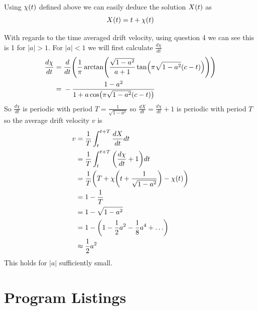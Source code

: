 \documentclass[11pt]{article} %
\let\originalleft\left
\let\originalright\right
\renewcommand{\left}{\mathopen{}\mathclose\bgroup\originalleft}
\renewcommand{\right}{\aftergroup\egroup\originalright}
\begin{document}
Using $\chi\left(t\right)$ defined above we can easily deduce the solution $X\left(t\right)$ as
\begin{equation*}
	X\left(t\right) = t + \chi\left(t\right)
\end{equation*}

With regards to the time averaged drift velocity, using question 4 we can see this is 1 for $|a|>1$. For $|a| <1$ we will first calculate $\frac{d\chi}{dt}$
\begin{align*}
	\frac{d\chi}{dt} = {} & \frac{d}{dt}\left(\frac{1}{\pi}\arctan\left(\frac{\sqrt{1-a^2}}{a+1}\tan\left(\pi\sqrt{1-a^2}\left(c-t\right)\right)\right)\right) \\
			     = {} & -\frac{1-a^2}{1+a\cos\left(\pi\sqrt{1-a^2}\left(c-t\right)\right)}
\end{align*}
So $\frac{d\chi}{dt}$ is periodic with period $T = \frac{1}{\sqrt{1-a^2}}$ so $\frac{dX}{dt} = \frac{d\chi}{dt} + 1$ is periodic with period $T$ so the average drift velocity $v$ is
\begin{align*}
	v = {} & \frac{1}{T}\int_{t}^{t+T}{\frac{dX}{dt} dt}\\
	   = {} & \frac{1}{T}\int_{t}^{t+T}{\left(\frac{d\chi}{dt}+1\right) dt} \\
	   = {} & \frac{1}{T}\left(T + \chi\left(t+\frac{1}{\sqrt{1-a^2}}\right)-\chi\left(t\right)\right) \\
	   = {} & 1 - \frac{1}{T} \\
	   = {} & 1 - \sqrt{1-a^2} \\
	   = {} & 1 - \left(1-\frac{1}{2}a^2-\frac{1}{8}a^4 + \dots \right) \\
	   \approx {} & \frac{1}{2}a^2
\end{align*}
This holds for $|a|$ sufficiently small.

\newpage
\section*{Program Listings}
\end{document}
